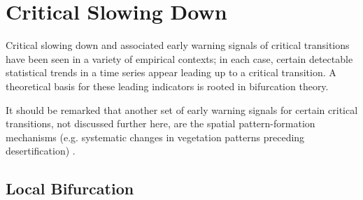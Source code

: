 \section{Critical Slowing Down}
\label{sec:csd}

Critical slowing down and associated early warning signals of critical transitions have been seen in a variety of empirical contexts; in each case, certain detectable statistical trends in a time series appear leading up to a critical transition. A theoretical basis for these leading indicators is rooted in bifurcation theory. 

It should be remarked that another set of early warning signals for certain critical transitions, not discussed further here, are the spatial pattern-formation mechanisms (e.g. systematic changes in vegetation patterns preceding desertification) . 






\subsection{Local Bifurcation}

